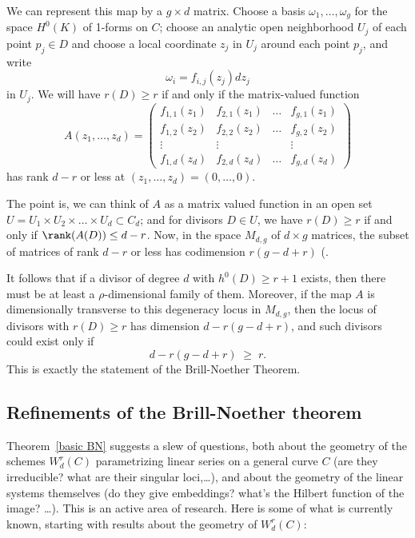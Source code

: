 We can represent this map by a $g \times d$ matrix. Choose a basis $\omega_1,\dots,\omega_g$ for the space $H^0(K)$ of 1-forms on $C$; choose an analytic open neighborhood $U_j$ of each point $p_j \in D$ and choose a local coordinate $z_j$ in $U_j$ around each point $p_j$, and write
$$
\omega_i = f_{i,j}(z_j)dz_j
$$
in $U_j$. We will have $r(D) \geq r$ if and only if the  matrix-valued function
$$
A(z_1,\dots,z_d) = 
\begin{pmatrix}
f_{1,1}(z_1) & f_{2,1}(z_1) & \dots & f_{g,1}(z_1) \\
f_{1,2}(z_2) & f_{2,2}(z_2) & \dots & f_{g,2}(z_2) \\
\vdots & \vdots &  & \vdots \\
f_{1,d}(z_d) & f_{2,d}(z_d) & \dots & f_{g,d} (z_d)
\end{pmatrix}
$$
has rank $d-r$ or less at $(z_1,\dots,z_d) = (0,\dots,0)$.

The point is, we can think of $A$ as a matrix valued function in an open set $U = U_1 \times U_2 \times \dots \times U_d \subset C_d$; and for divisors $D \in U$, we have $r(D) \geq r$ if and only if $\rank(A(D)) \leq d-r$. Now, in the space $M_{d,g}$ of $d \times g$ matrices, the subset of matrices of rank $d-r$ or less has codimension $r(g-d+r)$ (\cite[Theorem ****]{Eisenbud1995}. 

It follows 
that if  a divisor of degree $d$ with $h^0(D) \geq r+1$ exists, then there must be at least a $\rho$-dimensional family of them. Moreover, if the map $A$ is dimensionally transverse to this degeneracy locus in $M_{d,g}$, then the locus of divisors with $r(D) \geq r$ has dimension $d - r(g-d+r)$, and such divisors could exist only if
$$
d - r(g-d+r) \; \geq \; r.
$$
This is exactly the statement of the Brill-Noether Theorem.


\subsection{Refinements of the Brill-Noether theorem}

Theorem~\ref{basic BN} suggests a slew of questions, both about the geometry of the schemes $W^r_d(C)$ parametrizing linear series on a general curve $C$ (are they irreducible? what are their singular loci,\dots), and about the geometry of the linear systems themselves (do they give embeddings? what's the Hilbert function of the image? \dots). This is an active area of research. Here is some of what is currently known, starting with results about the geometry of $W^r_d(C)$:

